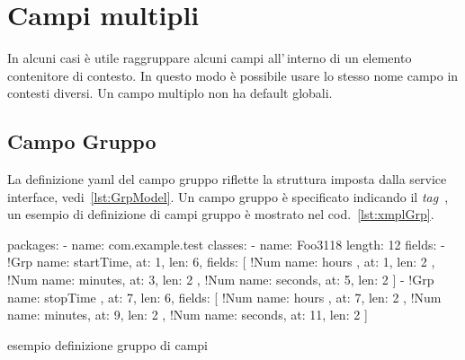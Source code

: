 \documentclass[a4paper,10pt]{report}
\newif\ifesource
\newenvironment{elisting}[1][H]
  {\captionsetup{aboveskip=0pt}\begin{listing}[#1]}
  {\end{listing}%
}
\begin{document}
\section{Campi multipli}
In alcuni casi è utile raggruppare alcuni campi all'\,interno di un elemento
contenitore di contesto. In questo modo è possibile usare lo stesso nome campo
in contesti diversi. Un campo multiplo non ha default globali.

\subsection{Campo Gruppo} \label{sub:yaml.grp}
La definizione yaml del campo gruppo riflette la struttura imposta dalla
service interface, vedi~\ref{lst:GrpModel}.
Un campo gruppo è specificato indicando il \textsl{tag} 
\,, 
un esempio di definizione di campi gruppo è mostrato nel 
cod.~\ref{lst:xmplGrp}.

\ifesource
\begin{figure*}[!htb]
\begin{lstlisting}[language=yaml, 
caption={esempio definizione gruppo di campi}, 
label=lst:xmplGrp]
packages:
  - name: com.example.test
    classes:
      - name: Foo3118
        length: 12
        fields:
          - !Grp { name: startTime, at: 1, len: 6, fields: [
            !Num { name: hours  , at: 1, len: 2 }, 
            !Num { name: minutes, at: 3, len: 2 }, 
            !Num { name: seconds, at: 5, len: 2 }
            ] }
          - !Grp { name: stopTime , at: 7, len: 6, fields: [
            !Num { name: hours  , at:  7, len: 2 }, 
            !Num { name: minutes, at:  9, len: 2 }, 
            !Num { name: seconds, at: 11, len: 2 }
            ] }
\end{lstlisting}
\end{figure*}
\else
\begin{elisting}[!htb]
\begin{yamlcode}
packages:
  - name: com.example.test
    classes:
      - name: Foo3118
        length: 12
        fields:
          - !Grp { name: startTime, at: 1, len: 6, fields: [
            !Num { name: hours  , at: 1, len: 2 }, 
            !Num { name: minutes, at: 3, len: 2 }, 
            !Num { name: seconds, at: 5, len: 2 }
            ] }
          - !Grp { name: stopTime , at: 7, len: 6, fields: [
            !Num { name: hours  , at:  7, len: 2 }, 
            !Num { name: minutes, at:  9, len: 2 }, 
            !Num { name: seconds, at: 11, len: 2 }
            ] }
\end{yamlcode}
\caption{esempio definizione gruppo di campi}
\label{lst:xmplGrp}
\end{elisting}
\fi
\end{document}
